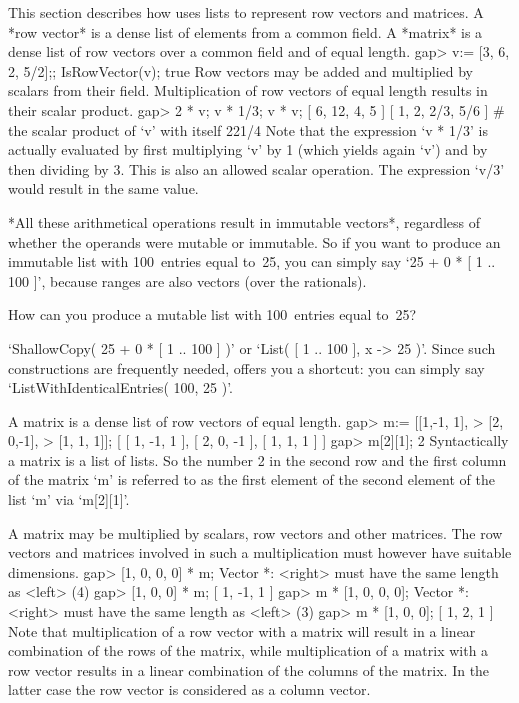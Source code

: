 %
This section describes how {\GAP} uses lists to represent row vectors and
matrices. A *row vector* is a dense list of elements from a common field.
A *matrix* is a dense list of row vectors over a common field and of
equal length.
\beginexample
    gap> v:= [3, 6, 2, 5/2];;  IsRowVector(v);
    true
\endexample
Row vectors  may be  added and multiplied   by scalars from  their field.
Multiplication of   row vectors of  equal length  results in their scalar
product.
\beginexample
    gap> 2 * v;  v * 1/3;  v * v;
    [ 6, 12, 4, 5 ]
    [ 1, 2, 2/3, 5/6 ]
    # the scalar product of `v' with itself
    221/4
\endexample
Note  that   the expression `v   *  1/3' is   actually evaluated by first
multiplying `v' by 1 (which yields again `v')  and by then dividing by 3.
This  is  also an allowed scalar   operation.  The expression `v/3' would
result in  the same value.

*All  these arithmetical  operations result in immutable vectors*,
regardless of whether the operands were mutable or immutable.
So if you want to produce an immutable list with 100~entries equal to~25,
you can simply say `25  + 0 * [ 1 .. 100 ]',
because ranges are also vectors (over the rationals).

%
\exercise  How can  you produce  a mutable  list  with 100~entries  equal
to~25?

\answer `ShallowCopy( 25 + 0 * [ 1 .. 100 ] )' or `List(  [ 1 .. 100 ], x
->  25 )'. Since such constructions  are frequently needed, {\GAP} offers
you a shortcut: you can simply say `ListWithIdenticalEntries( 100, 25 )'.

A matrix is a dense list of row vectors of equal length.
\beginexample
    gap> m:= [[1,-1, 1],
    >         [2, 0,-1],
    >         [1, 1, 1]];
    [ [ 1, -1, 1 ], [ 2, 0, -1 ], [ 1, 1, 1 ] ]
    gap> m[2][1];
    2
\endexample
Syntactically a matrix is a list of lists. So the number  2 in the second
row  and the first  column of the matrix `m'  is referred to as the first
element of the second element of the list `m' via `m[2][1]'.

A matrix may be multiplied by scalars, row vectors and other matrices.
The row vectors and matrices involved in such a multiplication must
however have suitable dimensions.
\beginexample
    gap> [1, 0, 0, 0] * m;
    Vector *: <right> must have the same length as <left> (4)
    gap> [1, 0, 0] * m;
    [ 1, -1, 1 ]
    gap> m * [1, 0, 0, 0];
    Vector *: <right> must have the same length as <left> (3)
    gap> m * [1, 0, 0];
    [ 1, 2, 1 ]
\endexample
Note that multiplication  of a row vector with  a matrix will result in a
linear combination of the  rows of the  matrix, while multiplication of a
matrix with a row  vector results in  a linear combination of the columns
of the  matrix. In  the latter case  the  row vector is considered   as a
column vector.

